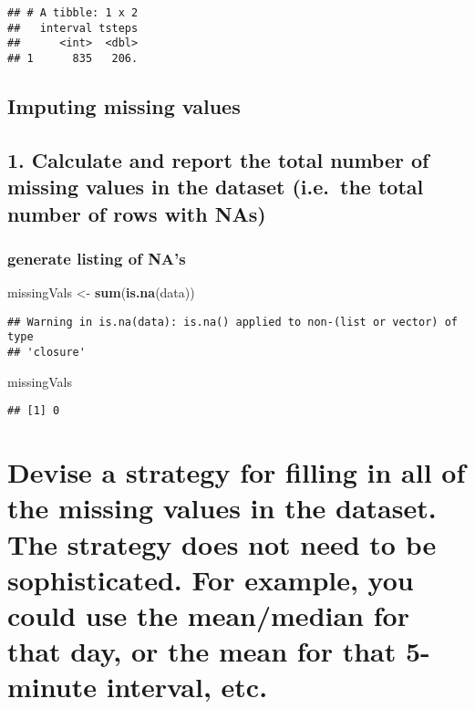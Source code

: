 \documentclass[]{article}
\newenvironment{Shaded}{\begin{snugshade}}{\end{snugshade}}
\newcommand{\KeywordTok}[1]{\textcolor[rgb]{0.13,0.29,0.53}{\textbf{#1}}}
\newcommand{\StringTok}[1]{\textcolor[rgb]{0.31,0.60,0.02}{#1}}
\newcommand{\NormalTok}[1]{#1}
\begin{document}
\begin{verbatim}
## # A tibble: 1 x 2
##   interval tsteps
##      <int>  <dbl>
## 1      835   206.
\end{verbatim}

\subsection{Imputing missing values}\label{imputing-missing-values}

\subsection{1. Calculate and report the total number of missing values
in the dataset (i.e.~the total number of rows with
NAs)}\label{calculate-and-report-the-total-number-of-missing-values-in-the-dataset-i.e.the-total-number-of-rows-with-nas}

\subsubsection{generate listing of NA's}\label{generate-listing-of-nas}

\begin{Shaded}
\begin{Highlighting}[]
\NormalTok{missingVals <-}\StringTok{ }\KeywordTok{sum}\NormalTok{(}\KeywordTok{is.na}\NormalTok{(data))}
\end{Highlighting}
\end{Shaded}

\begin{verbatim}
## Warning in is.na(data): is.na() applied to non-(list or vector) of type
## 'closure'
\end{verbatim}

\begin{Shaded}
\begin{Highlighting}[]
\NormalTok{missingVals}
\end{Highlighting}
\end{Shaded}

\begin{verbatim}
## [1] 0
\end{verbatim}

\section{Devise a strategy for filling in all of the missing values in
the dataset. The strategy does not need to be sophisticated. For
example, you could use the mean/median for that day, or the mean for
that 5-minute interval,
etc.}\label{devise-a-strategy-for-filling-in-all-of-the-missing-values-in-the-dataset.-the-strategy-does-not-need-to-be-sophisticated.-for-example-you-could-use-the-meanmedian-for-that-day-or-the-mean-for-that-5-minute-interval-etc.}
\end{document}
